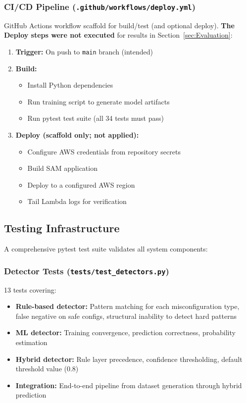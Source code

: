 \subsubsection{CI/CD Pipeline (\texttt{.github/workflows/deploy.yml})}

GitHub Actions workflow scaffold for build/test (and optional deploy). \textbf{The Deploy steps were not executed} for results in Section~\ref{sec:Evaluation}:

\begin{enumerate}
  \item \textbf{Trigger:} On push to \texttt{main} branch (intended)
  \item \textbf{Build:}
  \begin{itemize}
    \item Install Python dependencies
    \item Run training script to generate model artifacts
    \item Run pytest test suite (all 34 tests must pass)
  \end{itemize}
  \item \textbf{Deploy (scaffold only; not applied):}
  \begin{itemize}
    \item Configure AWS credentials from repository secrets
    \item Build SAM application
    \item Deploy to a configured AWS region
    \item Tail Lambda logs for verification
  \end{itemize}
\end{enumerate}

\subsection{Testing Infrastructure}

A comprehensive pytest test suite validates all system components:

\subsubsection{Detector Tests (\texttt{tests/test\_detectors.py})}

13 tests covering:
\begin{itemize}
  \item \textbf{Rule-based detector:} Pattern matching for each misconfiguration type, false negative on safe configs, structural inability to detect hard patterns
  \item \textbf{ML detector:} Training convergence, prediction correctness, probability estimation
  \item \textbf{Hybrid detector:} Rule layer precedence, confidence thresholding, default threshold value (0.8)
  \item \textbf{Integration:} End-to-end pipeline from dataset generation through hybrid prediction
\end{itemize}

